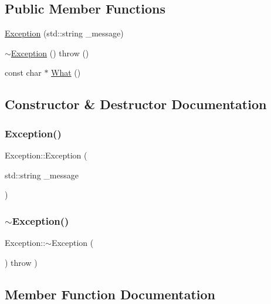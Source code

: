 \subsection*{Public Member Functions}
\begin{DoxyCompactItemize}
\item 
\mbox{\hyperlink{class_exception_ad17bdcd9d14fcb0fa63a2a78c8e8ce7f}{Exception}} (std\+::string \+\_\+message)
\item 
\mbox{\hyperlink{class_exception_a6b214cd8627d0968bdeebc1fbb9556b8}{$\sim$\+Exception}} ()  throw ()
\item 
const char $\ast$ \mbox{\hyperlink{class_exception_a074e6e0496fe2cd72a8677615e7d1f61}{What}} ()
\end{DoxyCompactItemize}


\subsection{Constructor \& Destructor Documentation}
\mbox{\label{class_exception_ad17bdcd9d14fcb0fa63a2a78c8e8ce7f}} 
\subsubsection{\texorpdfstring{Exception()}{Exception()}}
{\footnotesize\ttfamily Exception\+::\+Exception (\begin{DoxyParamCaption}\item[{std\+::string}]{\+\_\+message }\end{DoxyParamCaption})}

\mbox{\label{class_exception_a6b214cd8627d0968bdeebc1fbb9556b8}} 
\subsubsection{\texorpdfstring{$\sim$\+Exception()}{~Exception()}}
{\footnotesize\ttfamily Exception\+::$\sim$\+Exception (\begin{DoxyParamCaption}{ }\end{DoxyParamCaption}) throw  ) }



\subsection{Member Function Documentation}
\mbox{\label{class_exception_a074e6e0496fe2cd72a8677615e7d1f61}} 
